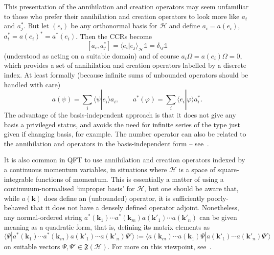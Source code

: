 \documentclass[12pt]{article}
\newcommand{\1}{\mathds{1}}                         %
\newcommand{\FF}{{\mathfrak{F}}}
\newcommand{\HH}{{\mathcal{H}}}
\newcommand{\II}{{\mathbb{1}}}
\newcommand{\kb}{{\boldsymbol{k}}}
\newcommand{\ip}[2]{\langle #1|#2\rangle}
\begin{document}
This presentation of the annihilation and creation operators may seem unfamiliar to those who prefer their annihilation and creation operators to look more like $a_i$ and $a_j^*$. But let $(e_i)$ be any orthonormal basis for $\HH$ and define $a_i = a(e_i)$, $a_i^*=a(e_i)^*=a^*(e_i)$. Then the CCRs become
\[
[a_i,a_j^*] = \ip{e_i}{e_j}_\HH \II = \delta_{ij}\II
\]
(understood as acting on a suitable domain) and of course $a_i\Omega=a(e_i)\Omega=0$,
which provides a set of annihilation and creation operators labelled by a discrete index. At least formally (because infinite sums of unbounded operators should be handled with care)
\[
a(\psi) = \sum_i \ip{\psi}{e_i}a_i,\qquad 
a^*(\varphi) = \sum_i \ip{e_i}{\varphi}a_i^*.
\]
The advantage of the basis-independent approach is that it does not give any basis a privileged status, and avoids the need for infinite series of the type just given if changing basis, for example. The number operator can also be related to the annihilation and operators in the basis-independent form -- see~\cite[\S 5.2.3]{BratRob:vol2}.

It is also common in QFT to use annihilation and creation operators indexed by a continuous momentum variables, in situations where $\HH$ is a space of square-integrable functions of momentum. This is essentially a matter of using a continuuum-normalised `improper basis' for $\HH$, but one should be aware that, while
$a(\kb)$ does define an (unbounded) operator, it is sufficiently poorly-behaved that it does not have a densely defined operator adjoint. Nonetheless, any normal-ordered string 
$a^*(\kb_1)\cdots a^*(\kb_m)a(\kb'_{1})\cdots a(\kb'_n)$ can be given
meaning as a quadratic form, that is, defining its matrix elements as
\[
\ip{\Psi}{a^*(\kb_1)\cdots a^*(\kb_m)a(\kb'_{1})\cdots a(\kb'_n)\Psi'}:=
\ip{a(\kb_m)\cdots a(\kb_1)\Psi}{a(\kb'_{1})\cdots a(\kb'_n)\Psi'}
\]  
on suitable vectors $\Psi,\Psi'\in\FF(\HH)$. For more on this viewpoint, see~\cite[\S X.7]{ReedSimon:vol2}.
\end{document}
